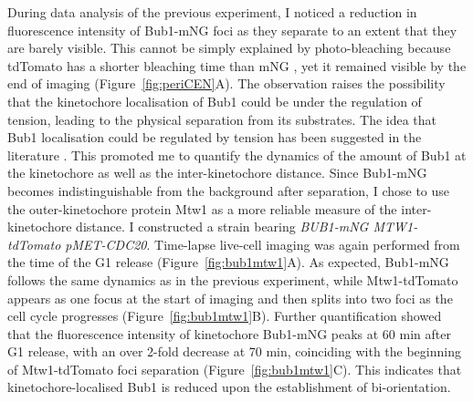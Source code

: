 During data analysis of the previous experiment, I noticed a reduction in fluorescence intensity of Bub1-mNG foci as they separate to an extent that they are barely visible. This cannot be simply explained by photo-bleaching because tdTomato has a shorter bleaching time than mNG \citep{Jin2020DNAProbes}, yet it remained visible by the end of imaging (Figure~\ref{fig:periCEN}A). The observation raises the possibility that the kinetochore localisation of Bub1 could be under the regulation of tension, leading to the physical separation from its substrates. The idea that Bub1 localisation could be regulated by tension has been suggested in the literature \citep{Asai2020, Proudfoot2019, Jin2017PrematureCerevisiae}. This promoted me to quantify the dynamics of the amount of Bub1 at the kinetochore as well as the inter-kinetochore distance. Since Bub1-mNG becomes indistinguishable from the background after separation, I chose to use the outer-kinetochore protein Mtw1 as a more reliable measure of the inter-kinetochore distance. I constructed a strain bearing \textit{BUB1-mNG MTW1-tdTomato pMET-CDC20}. Time-lapse live-cell imaging was again performed from the time of the G1 release (Figure~\ref{fig:bub1mtw1}A). As expected, Bub1-mNG follows the same dynamics as in the previous experiment, while Mtw1-tdTomato appears as one focus at the start of imaging and then splits into two foci as the cell cycle progresses (Figure~\ref{fig:bub1mtw1}B). Further quantification showed that the fluorescence intensity of kinetochore Bub1-mNG peaks at 60 \si{\minute} after G1 release, with an over 2-fold decrease at 70 \si{\minute}, coinciding with the beginning of Mtw1-tdTomato foci separation (Figure~\ref{fig:bub1mtw1}C). This indicates that kinetochore-localised Bub1 is reduced upon the establishment of bi-orientation. 

